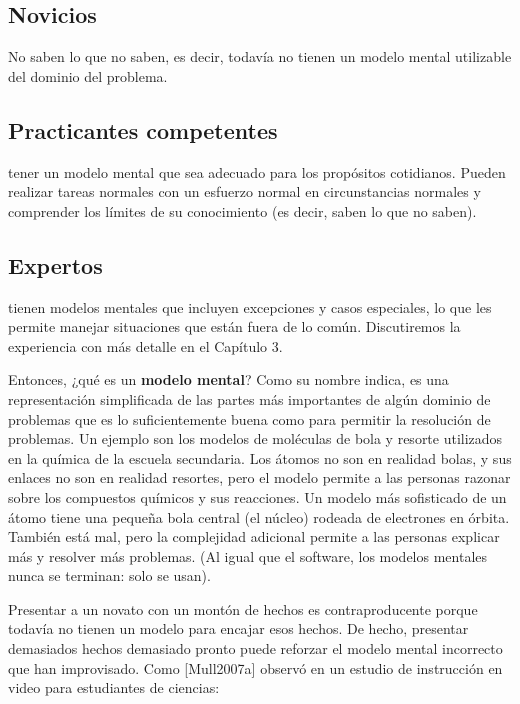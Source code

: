 \documentclass[
]{book}
\begin{document}
\hypertarget{novicios}{%
\subsection{Novicios}\label{novicios}}

No saben lo que no saben, es decir, todavía no tienen un modelo mental utilizable del dominio del problema.

\hypertarget{practicantes-competentes}{%
\subsection{Practicantes competentes}\label{practicantes-competentes}}

tener un modelo mental que sea adecuado para los propósitos cotidianos. Pueden realizar tareas normales con un esfuerzo normal en circunstancias normales y comprender los límites de su conocimiento (es decir, saben lo que no saben).

\hypertarget{expertos}{%
\subsection{Expertos}\label{expertos}}

tienen modelos mentales que incluyen excepciones y casos especiales, lo que les permite manejar situaciones que están fuera de lo común. Discutiremos la experiencia con más detalle en el Capítulo 3.

Entonces, ¿qué es un \textbf{modelo mental}? Como su nombre indica, es una representación simplificada de las partes más importantes de algún dominio de problemas que es lo suficientemente buena como para permitir la resolución de problemas. Un ejemplo son los modelos de moléculas de bola y resorte utilizados en la química de la escuela secundaria. Los átomos no son en realidad bolas, y sus enlaces no son en realidad resortes, pero el modelo permite a las personas razonar sobre los compuestos químicos y sus reacciones. Un modelo más sofisticado de un átomo tiene una pequeña bola central (el núcleo) rodeada de electrones en órbita. También está mal, pero la complejidad adicional permite a las personas explicar más y resolver más problemas. (Al igual que el software, los modelos mentales nunca se terminan: solo se usan).

Presentar a un novato con un montón de hechos es contraproducente porque todavía no tienen un modelo para encajar esos hechos. De hecho, presentar demasiados hechos demasiado pronto puede reforzar el modelo mental incorrecto que han improvisado. Como {[}Mull2007a{]} observó en un estudio de instrucción en video para estudiantes de ciencias:
\end{document}

